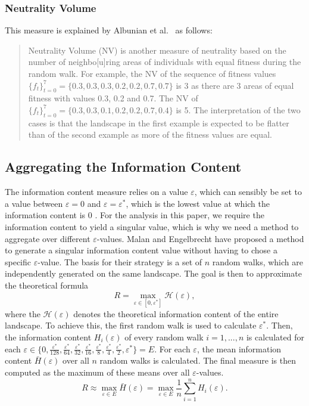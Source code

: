 \documentclass[
  a4paper,  %
  twoside,  %
  bibliography=totoc,
  headsepline,
  cleardoublepage=empty,
  parskip=half,
  draft=false
]{scrbook}
\begin{document}
\subsubsection{Neutrality Volume}
This measure is explained by Albunian et al.~\cite{albunian2020causes} as follows:
\begin{quote}
	Neutrality Volume (NV) is another measure of neutrality based on the number of neighbo[u]ring areas of individuals with equal fitness during the random walk. For example, the NV of the sequence of fitness values $\{f_t\}_{t = 0}^{7} = \{0.3, 0.3, 0.3, 0.2, 0.2, 0.7, 0.7\}$ is 3 as there are 3 areas of equal fitness with values 0.3, 0.2 and 0.7. The NV of $\{f_t\}_{t = 0}^{7} = \{0.3, 0.3, 0.1, 0.2, 0.2, 0.7, 0.4\}$ is 5. The interpretation of the two cases is that the landscape in the first example is expected to be flatter than of the second example as more of the fitness values are equal.
\end{quote}

\subsection{Aggregating the Information Content}\label{sec:aggr}

The information content measure relies on a value $\varepsilon$, which can sensibly be set to a value between $\varepsilon = 0$ and $\varepsilon = \varepsilon^{*}$, which is the lowest value at which the information content is $0$ \cite{vassilev2000information}.
For the analysis in this paper, we require the information content to yield a singular value, which is why we need a method to aggregate over different $\varepsilon$-values.
Malan and Engelbrecht \cite{malan2009quantifying} have proposed a method to generate a singular information content value without having to chose a specific $\varepsilon$-value.
The basis for their strategy is a set of $n$ random walks, which are independently generated on the same landscape.
The goal is then to approximate the theoretical formula
\begin{equation}
	R = \max_{\varepsilon \in [0, \varepsilon^{*}]} \mathcal{H}(\varepsilon),
\end{equation}
where the $\mathcal{H}(\varepsilon)$ denotes the theoretical information content of the entire landscape.
To achieve this, the first random walk is used to calculate $\varepsilon^{*}$.
Then, the information content $H_i(\varepsilon)$ of every random walk $i = 1, ..., n$ is calculated for each $\varepsilon \in \{0, \frac{\varepsilon^{*}}{128}, \frac{\varepsilon^{*}}{64}, \frac{\varepsilon^{*}}{32}, \frac{\varepsilon^{*}}{16}, \frac{\varepsilon^{*}}{8}, \frac{\varepsilon^{*}}{4}, \frac{\varepsilon^{*}}{2}, \varepsilon^{*}\} = E$.
For each $\varepsilon$, the mean information content $\bar{H}(\varepsilon)$ over all $n$ random walks is calculated.
The final measure is then computed as the maximum of these means over all $\varepsilon$-values.
\begin{equation}
	R \approx \max_{\varepsilon \in E} \bar{H}(\varepsilon) = \max_{\varepsilon \in E} \frac{1}{n}\sum_{i = 1}^{n} H_i(\varepsilon).
 	\end{equation}
\end{document}
